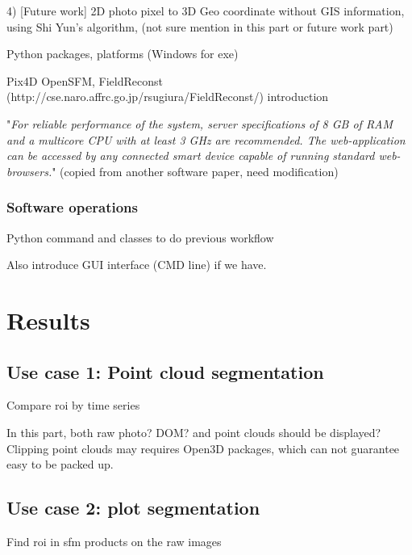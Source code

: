 \documentclass[sensors,article,submit,moreauthors, xelatex]{Definitions/mdpi}
\begin{document}
4) [Future work] 2D photo pixel to 3D Geo coordinate without GIS information, using Shi Yun's algorithm, (not sure mention in this part or future work part)

Python packages, platforms (Windows for exe)

Pix4D OpenSFM, FieldReconst (http://cse.naro.affrc.go.jp/rsugiura/FieldReconst/) introduction

"\textit{For reliable performance of the system, server specifications of 8 GB of RAM and a multicore CPU with at least 3 GHz are recommended. The web-application can be accessed by any connected smart device capable of
running standard web-browsers.}" (copied from another software paper, need modification)

\subsubsection{Software operations}
Python command and classes to do previous workflow

Also introduce GUI interface (CMD line) if we have.

\section{Results}

\subsection{Use case 1: Point cloud segmentation}
Compare \acrshort*{roi} by time series

In this part, both raw photo? DOM? and point clouds should be displayed? Clipping point clouds may requires Open3D packages, which can not guarantee easy to be packed up.

\subsection{Use case 2: plot segmentation}

Find \acrshort*{roi} in \acrshort*{sfm} products on the raw images
\end{document}
